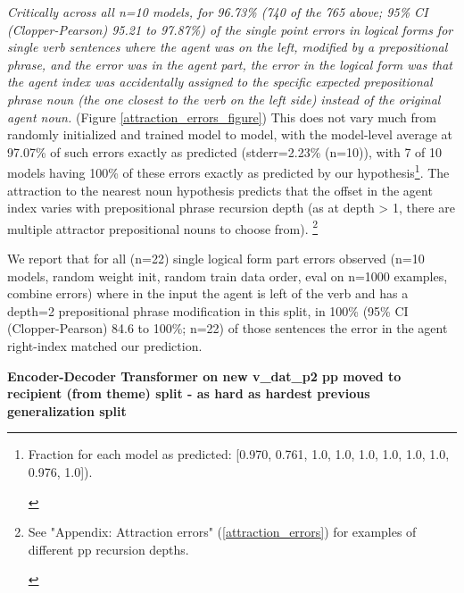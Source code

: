 \documentclass[11pt]{article}
\begin{document}
\textit{Critically across all n=10 \cite{Wu2023} models, for 96.73\% (740 of the 765 above; 95\% CI (Clopper-Pearson) 95.21 to 97.87\%) of the single point errors in logical forms for single verb sentences where the agent was on the left, modified by a prepositional phrase, and the error was in the agent part, the error in the logical form was that the agent index was accidentally assigned to the specific expected prepositional phrase noun (the one closest to the verb on the left side) instead of the original agent noun.} (Figure \ref{attraction_errors_figure})
This does not vary much from randomly initialized and trained model to model, with the model-level average at 97.07\% of such errors exactly as predicted (stderr=2.23\% (n=10)), with 7 of 10 models having 100\% of these errors exactly as predicted by our hypothesis\footnote{\begin{footnotesize}Fraction for each model as predicted: [0.970, 0.761, 1.0, 
1.0, 1.0, 1.0, 1.0, 1.0, 0.976, 1.0]).
\end{footnotesize}
}.
The attraction to the nearest noun hypothesis predicts that the offset in the agent index varies with prepositional phrase recursion depth (as at depth > 1, there are multiple attractor prepositional nouns to choose from).
\footnote{\begin{footnotesize}See "Appendix: Attraction errors" (\ref{attraction_errors}) for examples of different pp recursion depths.
\end{footnotesize}
}

We report that for all (n=22) single logical form part errors observed (n=10 models, random weight init, random train data order, eval on n=1000 examples, combine errors) where in the input the agent is left of the verb and has a depth=2 prepositional phrase modification in this split, in 100\% (95\% CI (Clopper-Pearson) 84.6 to 100\%; n=22) of those sentences the error in the agent right-index matched our prediction.\label{error_analysis_for_baseline_transformer_predict_and_confirm_attraction_errors}

\textbf{\cite{Wu2023} Encoder-Decoder Transformer on new v\_dat\_p2 pp moved to recipient (from theme) split - as hard as hardest previous generalization split}
\end{document}
